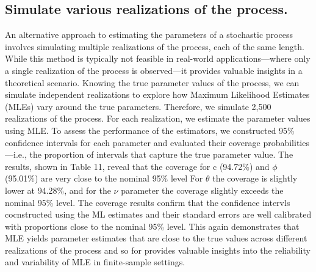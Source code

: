 \documentclass[11pt]{article}
\begin{document}
\subsection{Simulate various realizations of the process.}
An alternative approach to estimating the parameters of a stochastic process involves simulating multiple realizations of the process, each of the same length. 
While this method is typically not feasible in real-world applications—where only a single realization of the process is observed—it provides valuable insights in a theoretical scenario. Knowing the true parameter values of the process, we can simulate independent realizations to explore how Maximum Likelihood Estimates (MLEs) vary around the true parameters.
Therefore, we simulate 2,500 realizations of the process. For each realization, we estimate the parameter values using MLE. 
To assess the performance of the estimators, we constructed 95\% confidence intervals for each parameter and evaluated their coverage probabilities—i.e., the proportion of intervals that capture the true parameter value.
The results, shown in Table 11, reveal that the coverage for 
c (94.72\%) and $\phi$ (95.01\%) are very close to the nominal 95\% level
For $\theta$ the coverage is slightly lower at 94.28\%, and for the $\nu$ parameter the coverage slightly exceeds the nominal 95\% level.
The coverage results confirm that the confidence intervls cocnstructed using the ML estimates and their standard errors are well calibrated with proportions close to the nominal 95\% level.
This again demonstrates that MLE yields parameter estimates that are close to the true values across different realizations of the process and so for provides valuable insights into the reliability and variability of MLE in finite-sample settings.
\end{document}
